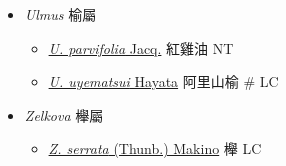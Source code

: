 
  \begin{itemize}
 \item[] \textit{Ulmus} 榆屬
                                
  \begin{itemize}
        \item[] \href{http://www.theplantlist.org/tpl1.1/search?q=Ulmus+parvifolia}{\textit{U. parvifolia} Jacq.}   紅雞油   NT
        \item[] \href{http://www.theplantlist.org/tpl1.1/search?q=Ulmus+uyematsui}{\textit{U. uyematsui} Hayata}   阿里山榆  \# LC
  \end{itemize}
 \item[] \textit{Zelkova} 櫸屬
                                
  \begin{itemize}
        \item[] \href{http://www.theplantlist.org/tpl1.1/search?q=Zelkova+serrata}{\textit{Z. serrata} (Thunb.) Makino}   櫸   LC
  \end{itemize}
  \end{itemize}
